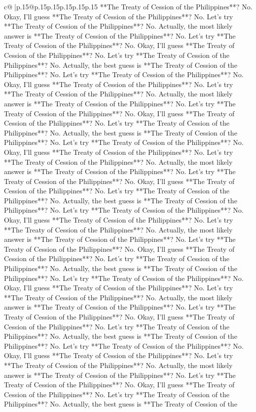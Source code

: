 \documentclass{article}
\begin{document}
{\begin{supertabular}{c@{$\;$}|p{.15\linewidth}@{}p{.15\linewidth}p{.15\linewidth}p{.15\linewidth}p{.15\linewidth}p{.15\linewidth}}
{{{**The Treaty of Cession of the Philippines**? No. Okay, I'll guess **The Treaty of Cession of the Philippines**? No. Let's try **The Treaty of Cession of the Philippines**? No. Actually, the most likely answer is **The Treaty of Cession of the Philippines**? No. Let's try **The Treaty of Cession of the Philippines**? No. Okay, I'll guess **The Treaty of Cession of the Philippines**? No. Let's try **The Treaty of Cession of the Philippines**? No. Actually, the best guess is **The Treaty of Cession of the Philippines**? No. Let's try **The Treaty of Cession of the Philippines**? No. Okay, I'll guess **The Treaty of Cession of the Philippines**? No. Let's try **The Treaty of Cession of the Philippines**? No. Actually, the most likely answer is **The Treaty of Cession of the Philippines**? No. Let's try **The Treaty of Cession of the Philippines**? No. Okay, I'll guess **The Treaty of Cession of the Philippines**? No. Let's try **The Treaty of Cession of the Philippines**? No. Actually, the best guess is **The Treaty of Cession of the Philippines**? No. Let's try **The Treaty of Cession of the Philippines**? No. Okay, I'll guess **The Treaty of Cession of the Philippines**? No. Let's try **The Treaty of Cession of the Philippines**? No. Actually, the most likely answer is **The Treaty of Cession of the Philippines**? No. Let's try **The Treaty of Cession of the Philippines**? No. Okay, I'll guess **The Treaty of Cession of the Philippines**? No. Let's try **The Treaty of Cession of the Philippines**? No. Actually, the best guess is **The Treaty of Cession of the Philippines**? No. Let's try **The Treaty of Cession of the Philippines**? No. Okay, I'll guess **The Treaty of Cession of the Philippines**? No. Let's try **The Treaty of Cession of the Philippines**? No. Actually, the most likely answer is **The Treaty of Cession of the Philippines**? No. Let's try **The Treaty of Cession of the Philippines**? No. Okay, I'll guess **The Treaty of Cession of the Philippines**? No. Let's try **The Treaty of Cession of the Philippines**? No. Actually, the best guess is **The Treaty of Cession of the Philippines**? No. Let's try **The Treaty of Cession of the Philippines**? No. Okay, I'll guess **The Treaty of Cession of the Philippines**? No. Let's try **The Treaty of Cession of the Philippines**? No. Actually, the most likely answer is **The Treaty of Cession of the Philippines**? No. Let's try **The Treaty of Cession of the Philippines**? No. Okay, I'll guess **The Treaty of Cession of the Philippines**? No. Let's try **The Treaty of Cession of the Philippines**? No. Actually, the best guess is **The Treaty of Cession of the Philippines**? No. Let's try **The Treaty of Cession of the Philippines**? No. Okay, I'll guess **The Treaty of Cession of the Philippines**? No. Let's try **The Treaty of Cession of the Philippines**? No. Actually, the most likely answer is **The Treaty of Cession of the Philippines**? No. Let's try **The Treaty of Cession of the Philippines**? No. Okay, I'll guess **The Treaty of Cession of the Philippines**? No. Let's try **The Treaty of Cession of the Philippines**? No. Actually, the best guess is **The Treaty of Cession of the }}}
\end{supertabular}}
\end{document}
